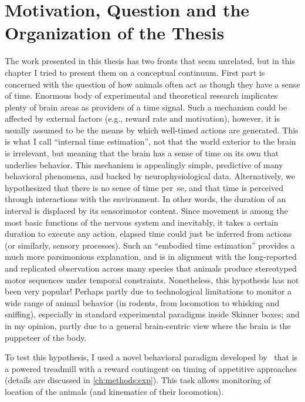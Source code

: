 \section[Motivation, Question and More]{Motivation, Question and the Organization of the Thesis}
\label{intro:question}

The work presented in this thesis has two fronts that seem unrelated, but in this chapter I tried to present them on a conceptual continuum.
First part is concerned with the question of how animals often act as though they have a sense of time.
Enormous body of experimental and theoretical research implicates plenty of brain areas as providers of a time signal.
Such a mechanism could be affected by external factors (e.g., reward rate and motivation), however, it is usually assumed to be the means by which well-timed actions are generated.
This is what I call ``internal time estimation'', not that the world exterior to the brain is irrelevant, but meaning that the brain has a sense of time on its own that underlies behavior.
This mechanism is appealingly simple, predictive of many behavioral phenomena, and backed by neurophysiological data.
Alternatively, we hypothesized that there is no sense of time per~se, and that time is perceived through interactions with the environment.
In other words, the duration of an interval is displaced by its sensorimotor content.
Since movement is among the most basic functions of the nervous system and inevitably, it takes a certain duration to execute any action, elapsed time could just be inferred from actions (or similarly, sensory processes).
Such an ``embodied time estimation'' provides a much more parsimonious explanation, and is in alignment with the long-reported and replicated observation across many species that animals produce stereotyped motor sequences under temporal constraints.
Nonetheless, this hypothesis has not been very popular!
Perhaps partly due to technological limitations to monitor a wide range of animal behavior (in rodents, from locomotion to whisking and sniffing), especially in standard experimental paradigms inside Skinner boxes; and in my opinion, partly due to a general brain-centric view where the brain is the puppeteer of the body.
\par
To test this hypothesis, I used a novel behavioral paradigm developed by~\citeauthor{Rueda2015NN} that is a powered treadmill with a reward contingent on timing of appetitive approaches (details are discussed in \autoref{ch:methods:exp}).
This task allows monitoring of location of the animals (and kinematics of their locomotion).
